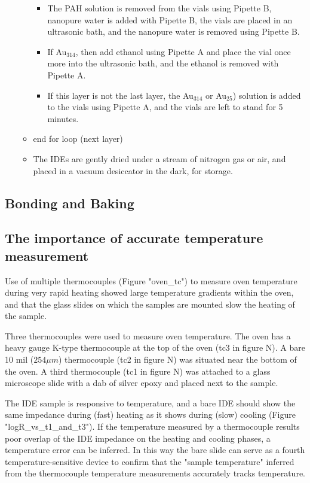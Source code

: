 \documentclass[12pt,oneside,english]{article}
\begin{document}
\begin{itemize}
\begin{itemize}
\begin{itemize}
				\item The PAH solution is removed from the vials using Pipette B,  nanopure water is added with Pipette B, the vials are placed in an ultrasonic bath, and the nanopure water is removed using Pipette B.
				\item If Au$_{314}$, then add ethanol using Pipette A and place the vial once more into the ultrasonic bath, and the ethanol is removed with Pipette A.
				\item If this layer is not the last layer, the Au$_{314}$ or Au$_{25}$) solution is added to the vials using Pipette A, and the vials are left to stand for 5 minutes.
			\end{itemize}
			\item end for loop (next layer)
			\item The IDEs are gently dried under a stream of nitrogen gas or air, and placed in a vacuum desiccator in the dark, for storage.
		\end{itemize}
	\end{itemize}

	\subsection{Bonding and Baking}
	
	\subsection{The importance of accurate temperature measurement}
	Use of multiple thermocouples (Figure "oven\_tc") to measure oven temperature during very rapid heating showed large temperature gradients within the oven, and that the glass slides on which the samples are mounted slow the heating of the sample.

	Three thermocouples were used to measure oven temperature.  
	The oven has a heavy gauge K-type thermocouple at the top of the oven (tc3 in figure N).  
	A bare 10 mil ($254{\mu}m$) thermocouple (tc2 in figure N) was situated near the bottom of the oven.  
	A third thermocouple (tc1 in figure N) was attached to a glass microscope slide with a dab of silver epoxy and placed next to the sample.
	
	The IDE sample is responsive to temperature, and a bare IDE should show the same impedance during (fast) heating as it shows during (slow) cooling (Figure "logR\_vs\_t1\_and\_t3").  
	If the temperature measured by a thermocouple results poor overlap of the IDE impedance on the heating and cooling phases, a temperature error can be inferred.
	In this way the bare slide can serve as a fourth temperature-sensitive device to confirm that the "sample temperature" inferred from the thermocouple temperature measurements accurately tracks temperature.  
	
\end{document}
